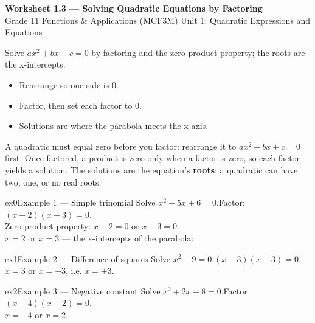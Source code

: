 \documentclass[11pt]{article}
\begin{document}
\begin{center}
{\LARGE\bfseries\color{titleblue}Worksheet 1.3 --- Solving Quadratic Equations by Factoring}\\[2pt]
{\small Grade 11 Functions \& Applications (MCF3M) \textperiodcentered{} Unit 1: Quadratic Expressions and Equations}
\end{center}

\begin{ideabox}
Solve $ax^2+bx+c=0$ by factoring and the zero product property; the roots are the x-intercepts.
\begin{itemize}[leftmargin=*,itemsep=2pt]
  \item Rearrange so one side is $0$.
  \item Factor, then set each factor to $0$.
  \item Solutions are where the parabola meets the x-axis.
\end{itemize}
\end{ideabox}

\begin{learnbox}
A quadratic must equal zero before you factor: rearrange it to $ax^2+bx+c=0$ first.
Once factored, a product is zero only when a factor is zero, so each factor yields a solution.
The solutions are the equation's \textbf{roots}; a quadratic can have two, one, or no real roots.
\end{learnbox}


\begin{example}{ex0}{Example 1 --- Simple trinomial}
Solve $x^2-5x+6=0$.\soln Factor: $(x-2)(x-3)=0$. \\ Zero product property: $x-2=0$ or $x-3=0$. \\ $x=2$ or $x=3$ — the x-intercepts of the parabola:
\end{example}

\begin{example}{ex1}{Example 2 --- Difference of squares}
Solve $x^2-9=0$.\soln $(x-3)(x+3)=0$. \\ $x=3$ or $x=-3$, i.e. $x=\pm3$.
\end{example}

\begin{example}{ex2}{Example 3 --- Negative constant}
Solve $x^2+2x-8=0$.\soln Factor $(x+4)(x-2)=0$. \\ $x=-4$ or $x=2$.
\end{example}
\end{document}
